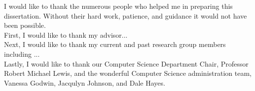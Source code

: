 \large
{\parindent0pt 
I would like to thank the numerous people who helped me in preparing this dissertation.  Without their hard work, patience, and guidance it would not have been possible. \\

First, I would like to thank my advisor...\\ 

Next, I would like to thank my current and past research group members including ... \\

Lastly, I would like to thank our Computer Science Department Chair, Professor Robert Michael Lewis, and the wonderful Computer Science administration team, Vanessa Godwin, Jacqulyn Johnson, and Dale Hayes.
}

